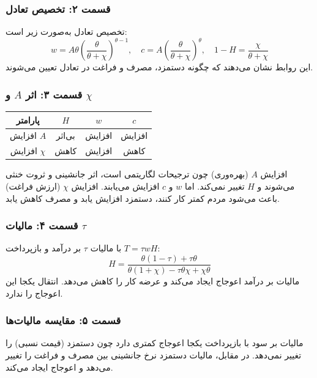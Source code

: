 \documentclass[12pt,a4paper]{article}
\begin{document}
\subsubsection*{قسمت ۲: تخصیص تعادل}

تخصیص تعادل به‌صورت زیر است:
\[
	w = A \theta \left(\frac{\theta}{\theta + \chi}\right)^{\theta - 1}, \quad
	c = A \left(\frac{\theta}{\theta + \chi}\right)^\theta, \quad
	1 - H = \frac{\chi}{\theta + \chi}
\]
این روابط نشان می‌دهند که چگونه دستمزد، مصرف و فراغت در تعادل تعیین می‌شوند.

\subsubsection*{قسمت ۳: اثر $A$ و $\chi$}

\begin{center}
	\begin{tabular}{|c|c|c|c|}
		\hline
		\textbf{پارامتر} & $H$   & $w$    & $c$    \\
		\hline
		افزایش $A$       & بی‌اثر & افزایش & افزایش \\
		\hline
		افزایش $\chi$    & کاهش  & افزایش & کاهش   \\
		\hline
	\end{tabular}
\end{center}

افزایش $A$ (بهره‌وری) چون ترجیحات لگاریتمی است، اثر جانشینی و ثروت خنثی می‌شوند و $H$ تغییر نمی‌کند. اما $w$ و $c$ افزایش می‌یابند. افزایش $\chi$ (ارزش فراغت) باعث می‌شود مردم کمتر کار کنند، دستمزد افزایش یابد و مصرف کاهش یابد.

\subsubsection*{قسمت ۴: مالیات $\tau$}

با مالیات $\tau$ بر درآمد و بازپرداخت $T = \tau w H$:
\[
	H = \frac{\theta (1 - \tau) + \tau \theta}{\theta (1 + \chi) - \tau \theta \chi + \chi \theta}
\]
مالیات بر درآمد اعوجاج ایجاد می‌کند و عرضه کار را کاهش می‌دهد. انتقال یکجا این اعوجاج را ندارد.

\subsubsection*{قسمت ۵: مقایسه مالیات‌ها}

مالیات بر سود با بازپرداخت یکجا اعوجاج کمتری دارد چون دستمزد (قیمت نسبی) را تغییر نمی‌دهد. در مقابل، مالیات دستمزد نرخ جانشینی بین مصرف و فراغت را تغییر می‌دهد و اعوجاج ایجاد می‌کند.
\end{document}
